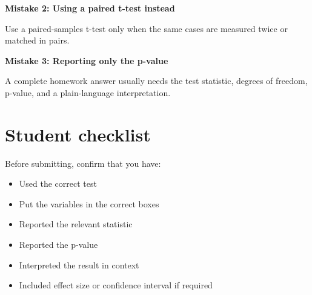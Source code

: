 \documentclass[
  letterpaper,
  DIV=11,
  numbers=noendperiod]{scrreprt}
\providecommand{\tightlist}{%
  \setlength{\itemsep}{0pt}\setlength{\parskip}{0pt}}
\begin{document}
\begin{tcolorbox}[enhanced jigsaw, arc=.35mm, bottomrule=.15mm, breakable, colback=white, colframe=quarto-callout-warning-color-frame, left=2mm, leftrule=.75mm, opacityback=0, rightrule=.15mm, toprule=.15mm]
\begin{minipage}[t]{5.5mm}
\textcolor{quarto-callout-warning-color}{\faExclamationTriangle}
\end{minipage}%
\begin{minipage}[t]{\textwidth - 5.5mm}

\vspace{-3mm}\textbf{Mistake 2: Using a paired t-test instead}\vspace{3mm}

Use a paired-samples t-test only when the same cases are measured twice
or matched in pairs.

\end{minipage}%
\end{tcolorbox}

\begin{tcolorbox}[enhanced jigsaw, arc=.35mm, bottomrule=.15mm, breakable, colback=white, colframe=quarto-callout-warning-color-frame, left=2mm, leftrule=.75mm, opacityback=0, rightrule=.15mm, toprule=.15mm]
\begin{minipage}[t]{5.5mm}
\textcolor{quarto-callout-warning-color}{\faExclamationTriangle}
\end{minipage}%
\begin{minipage}[t]{\textwidth - 5.5mm}

\vspace{-3mm}\textbf{Mistake 3: Reporting only the p-value}\vspace{3mm}

A complete homework answer usually needs the test statistic, degrees of
freedom, p-value, and a plain-language interpretation.

\end{minipage}%
\end{tcolorbox}

\section{Student checklist}\label{student-checklist}

Before submitting, confirm that you have:

\begin{itemize}
\tightlist
\item[$\square$]
  Used the correct test
\item[$\square$]
  Put the variables in the correct boxes
\item[$\square$]
  Reported the relevant statistic
\item[$\square$]
  Reported the p-value
\item[$\square$]
  Interpreted the result in context
\item[$\square$]
  Included effect size or confidence interval if required
\end{itemize}
\end{document}
